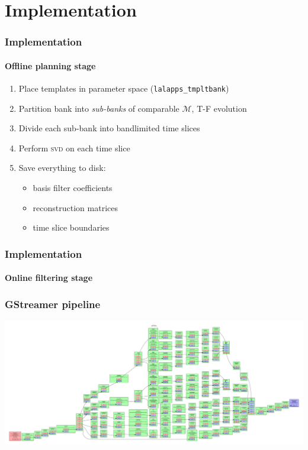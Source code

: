 \documentclass{beamer}
\begin{document}
\section{Implementation}

\begin{frame}
	\frametitle{Implementation}
	\framesubtitle{Offline planning stage}
	\begin{enumerate}
		\item Place templates in parameter space (\texttt{lalapps\_tmpltbank})
		\item Partition bank into \emph{sub-banks} of comparable $\mathcal{M}$, T-F evolution
		\item Divide each sub-bank into bandlimited time slices
		\item Perform \textsc{svd} on each time slice
		\item Save everything to disk:
			\begin{itemize}
				\item basis filter coefficients
				\item reconstruction matrices
				\item time slice boundaries
			\end{itemize}
	\end{enumerate}
	\begin{flushright}
	\end{flushright}
\end{frame}

\begin{frame}
	\frametitle{Implementation}
	\framesubtitle{Online filtering stage}
\end{frame}

\begin{frame}
	\frametitle{GStreamer pipeline}
	\includegraphics[width=\textwidth]{figures/pipeline}
\end{frame}
\end{document}
